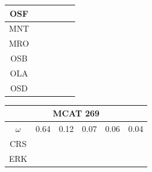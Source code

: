\documentclass[12pt]{article}
\begin{document}
\begin{landscape}
\begin{figure}
\begin{minipage}[c]{0.3\textwidth}
\begin{tabular}{|c|c|c|c|c|c|}
        OSF&\cellcolor[HTML]{4DAF4A}&\cellcolor[HTML]{4DAF4A}&\cellcolor[HTML]{984EA3}&\cellcolor[HTML]{4DAF4A}&\cellcolor[HTML]{4DAF4A}\\ \hline %
        MNT&\cellcolor[HTML]{4DAF4A}&\cellcolor[HTML]{4DAF4A}&\cellcolor[HTML]{984EA3}&\cellcolor[HTML]{4DAF4A}&\cellcolor[HTML]{4DAF4A}\\ \hline %
        MRO&\cellcolor[HTML]{4DAF4A}&\cellcolor[HTML]{4DAF4A}&\cellcolor[HTML]{984EA3}&\cellcolor[HTML]{984EA3}&\cellcolor[HTML]{984EA3}\\ \hline %
        OSB&\cellcolor[HTML]{984EA3}&\cellcolor[HTML]{984EA3}&\cellcolor[HTML]{FF7F00}&\cellcolor[HTML]{FF7F00}&\cellcolor[HTML]{984EA3}\\ \hline %
        OLA&\cellcolor[HTML]{FF7F00}&\cellcolor[HTML]{984EA3}&\cellcolor[HTML]{FF7F00}&\cellcolor[HTML]{FF7F00}&\cellcolor[HTML]{984EA3}\\ \hline %
        OSD&\cellcolor[HTML]{FF7F00}&\cellcolor[HTML]{FF7F00}&\cellcolor[HTML]{FF7F00}&\cellcolor[HTML]{FF7F00}&\cellcolor[HTML]{FF7F00}\\ \hline %
\end{tabular}
\end{minipage}
\begin{minipage}[c]{0.3\textwidth}
\hspace*{-2.5cm}
\begin{tabular}{|c|c|c|c|c|c|}%
         \hline \multicolumn{6}{|c|}{MCAT 269} \\ \hline
         $\omega$&0.64&0.12&0.07&0.06&0.04\\ \hline %
        CRS&\cellcolor[HTML]{E41A1C}&\cellcolor[HTML]{E41A1C}&\cellcolor[HTML]{E41A1C}&\cellcolor[HTML]{E41A1C}&\cellcolor[HTML]{E41A1C}\\ \hline %
        ERK&\cellcolor[HTML]{E41A1C}&\cellcolor[HTML]{E41A1C}&\cellcolor[HTML]{E41A1C}&\cellcolor[HTML]{E41A1C}&\cellcolor[HTML]{E41A1C}\\ \hline %

\end{tabular}
\end{minipage}
\end{figure}
\end{landscape}
\end{document}
